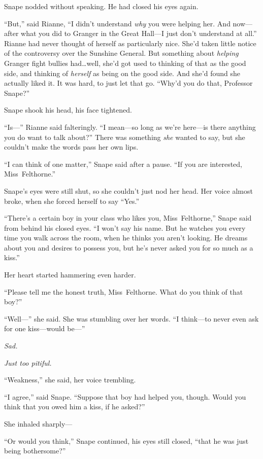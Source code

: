 Snape nodded without speaking. He had closed his eyes again.

“But,” said Rianne, “I didn’t understand \emph{why} you were helping her. And now—after what you did to Granger in the Great Hall—I just don’t understand at all.” Rianne had never thought of herself as particularly nice. She’d taken little notice of the controversy over the Sunshine General. But something about \emph{helping} Granger fight bullies had…well, she’d got used to thinking of that as the good side, and thinking of \emph{herself} as being on the good side. And she’d found she actually liked it. It was hard, to just let that go. “Why’d you do that, Professor Snape?”

Snape shook his head, his face tightened.

“Is—” Rianne said falteringly. “I mean—so long as we’re here—is there anything you do want to talk about?” There was something \emph{she} wanted to say, but she couldn’t make the words pass her own lips.

“I can think of one matter,” Snape said after a pause. “If you are interested, Miss~Felthorne.”

Snape’s eyes were still shut, so she couldn’t just nod her head. Her voice almost broke, when she forced herself to say “Yes.”

“There’s a certain boy in your class who likes you, Miss~Felthorne,” Snape said from behind his closed eyes. “I won’t say his name. But he watches you every time you walk across the room, when he thinks you aren’t looking. He dreams about you and desires to possess you, but he’s never asked you for so much as a kiss.”

Her heart started hammering even harder.

“Please tell me the honest truth, Miss~Felthorne. What do you think of that boy?”

“Well—” she said. She was stumbling over her words. “I think—to never even ask for one kiss—would be—”

\emph{Sad.}

\emph{Just too pitiful.}

“Weakness,” she said, her voice trembling.

“I agree,” said Snape. “Suppose that boy had helped you, though. Would you think that you owed him a kiss, if he asked?”

She inhaled sharply—

“Or would you think,” Snape continued, his eyes still closed, “that he was just being bothersome?”

